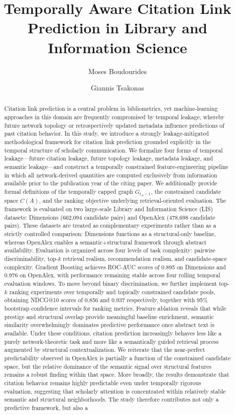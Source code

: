 \documentclass[11pt,a4paper]{article}
\title{Temporally Aware Citation Link Prediction in Library and Information Science}
\author[1]{Moses Boudourides}
\author[2]{Giannis Tsakonas}
\affil[1]{School of Professional Studies, Northwestern University, Evanston, IL, USA%
\authorcr\texttt{Moses.Boudourides@northwestern.edu}}
\affil[2]{Library \& Information Center, University of Patras, Greece%
\authorcr\texttt{gtsak@upatras.gr}}
\date{}
\begin{document}
\maketitle

\begin{abstract}
Citation link prediction is a central problem in bibliometrics, yet machine-learning approaches in this domain are frequently compromised by temporal leakage, whereby future network topology or retrospectively updated metadata influence predictions of past citation behavior. In this study, we introduce a strongly leakage-mitigated methodological framework for citation link prediction grounded explicitly in the temporal structure of scholarly communication. We formalize four forms of temporal leakage---future citation leakage, future topology leakage, metadata leakage, and semantic leakage---and construct a temporally constrained feature-engineering pipeline in which all network-derived quantities are computed exclusively from information available prior to the publication year of the citing paper. We additionally provide formal definitions of the temporally capped graph \(G_{t_A-1}\), the constrained candidate space \(C(A)\), and the ranking objective underlying retrieval-oriented evaluation. The framework is evaluated on two large-scale Library and Information Science (LIS) datasets: Dimensions (662,094 candidate pairs) and OpenAlex (478,698 candidate pairs). These datasets are treated as complementary experiments rather than as a strictly controlled comparison: Dimensions functions as a structural-only baseline, whereas OpenAlex enables a semantic+structural framework through abstract availability. Evaluation is organized across four levels of task complexity: pairwise discriminability, top-\(k\) retrieval realism, recommendation realism, and candidate-space complexity. Gradient Boosting achieves ROC-AUC scores of 0.895 on Dimensions and 0.976 on OpenAlex, with performance remaining stable across four rolling temporal evaluation windows. To move beyond binary discrimination, we further implement top-\(k\) ranking experiments over temporally and topically constrained candidate pools, obtaining NDCG@10 scores of 0.856 and 0.937 respectively, together with 95\% bootstrap confidence intervals for ranking metrics. Feature ablation reveals that while prestige and structural overlap provide meaningful baseline enrichment, semantic similarity overwhelmingly dominates predictive performance once abstract text is available. Under these conditions, citation prediction increasingly behaves less like a purely network-theoretic task and more like a semantically guided retrieval process augmented by structural contextualization. We reiterate that the near-perfect predictability observed in OpenAlex is partially a function of the constrained candidate space, but the relative dominance of the semantic signal over structural features remains a robust finding within that space. More broadly, the results demonstrate that citation behavior remains highly predictable even under temporally rigorous evaluation, suggesting that scholarly attention is concentrated within relatively stable semantic and structural neighborhoods. The study therefore contributes not only a predictive framework, but also a 
\end{abstract}
\end{document}
